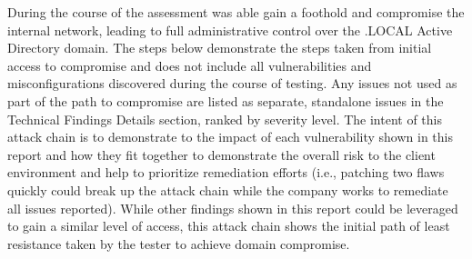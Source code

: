 \qquad During the course of the assessment \brandName was able gain a foothold and compromise the internal
network, leading to full administrative control over the \enterpriseName.LOCAL Active Directory domain. The steps
below demonstrate the steps taken from initial access to compromise and does not include all vulnerabilities and
misconfigurations discovered during the course of testing. Any issues not used as part of the path to compromise are
listed as separate, standalone issues in the Technical Findings Details section, ranked by severity level. The intent of this
attack chain is to demonstrate to \enterpriseName the impact of each vulnerability shown in this report and how they fit
together to demonstrate the overall risk to the client environment and help to prioritize remediation efforts (i.e., patching
two flaws quickly could break up the attack chain while the company works to remediate all issues reported). While other
findings shown in this report could be leveraged to gain a similar level of access, this attack chain shows the initial path
of least resistance taken by the tester to achieve domain compromise.
